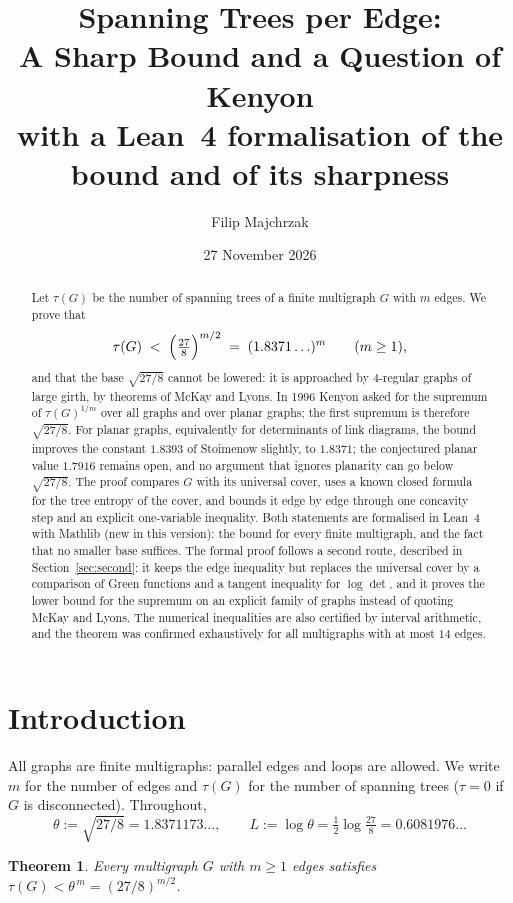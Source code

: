 \documentclass[11pt]{amsart}
\title[Spanning trees per edge]{Spanning Trees per Edge:\\ A Sharp Bound and a Question of Kenyon\\[4pt] {\normalfont\large with a Lean~4 formalisation of the bound and of its sharpness}}
\author{Filip Majchrzak}
\date{27 November 2026}
\theoremstyle{plain}
\newtheorem{theorem}{Theorem}
\theoremstyle{remark}
\newcommand{\tht}{\theta}
\begin{document}
\begin{abstract}
Let $\tau(G)$ be the number of spanning trees of a finite multigraph $G$ with $m$ edges. We prove that
\[
  \tau(G)\;<\;\Bigl(\tfrac{27}{8}\Bigr)^{m/2}\;=\;(1.8371\ldots)^m\qquad(m\ge1),
\]
and that the base $\sqrt{27/8}$ cannot be lowered: it is approached by $4$-regular graphs of large girth, by
theorems of McKay and Lyons. In 1996 Kenyon asked for the supremum of $\tau(G)^{1/m}$ over all graphs and over planar graphs;
the first supremum is therefore $\sqrt{27/8}$. For planar graphs, equivalently for determinants of link diagrams,
the bound improves the constant $1.8393$ of Stoimenow slightly, to $1.8371$; the conjectured planar value
$1.7916$ remains open, and no argument that ignores planarity can go below $\sqrt{27/8}$. The proof compares
$G$ with its universal cover, uses a known closed formula for the tree entropy of the cover, and bounds it edge
by edge through one concavity step and an explicit one-variable inequality.
Both statements are formalised in Lean~4 with Mathlib (new in this version): the bound for every finite multigraph, and the fact that no smaller base suffices. The formal proof follows a second route, described in Section~\ref{sec:second}: it keeps the edge inequality but replaces the universal cover by a comparison of Green functions and a tangent inequality for $\log\det$, and it proves the lower bound for the supremum on an explicit family of graphs instead of quoting McKay and Lyons. The numerical inequalities are also certified by interval arithmetic, and the theorem was confirmed exhaustively for all multigraphs with at most $14$ edges.
\end{abstract}

\maketitle

\section{Introduction}

All graphs are finite multigraphs: parallel edges and loops are allowed. We write $m$ for the number of edges and
$\tau(G)$ for the number of spanning trees ($\tau=0$ if $G$ is disconnected). Throughout,
\[
  \tht:=\sqrt{27/8}=1.8371173\ldots,\qquad L:=\log\tht=\tfrac12\log\tfrac{27}{8}=0.6081976\ldots
\]

\begin{theorem}\label{thm:main}
Every multigraph $G$ with $m\ge1$ edges satisfies $\tau(G)<\tht^{\,m}=(27/8)^{m/2}$.
\end{theorem}
\end{document}
